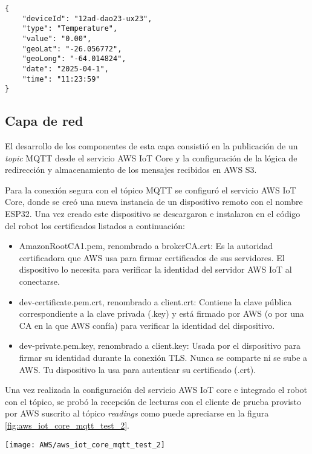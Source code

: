 \begin{lstlisting}
{   	
	"deviceId": "12ad-dao23-ux23",
	"type": "Temperature",
	"value": "0.00",
	"geoLat": "-26.056772",
	"geoLong": "-64.014824",
	"date": "2025-04-1",
	"time": "11:23:59"
}
\end{lstlisting}

\subsection{Capa de red}

El desarrollo de los componentes de esta capa consistió en la publicación de un \textit{topic} MQTT desde el servicio AWS IoT Core y la configuración de la lógica de redirección y almacenamiento de los mensajes recibidos en AWS S3.


Para la conexión segura con el tópico MQTT se configuró el servicio AWS IoT Core, donde se creó una nueva instancia de un dispositivo remoto con el nombre ESP32. Una vez creado este dispositivo se descargaron e instalaron en el código del robot los certificados listados a continuación:




\begin{itemize}
	\item AmazonRootCA1.pem, renombrado a brokerCA.crt:	Es la autoridad certificadora que AWS usa para firmar certificados de sus servidores. El dispositivo lo necesita para verificar la identidad del servidor AWS IoT al conectarse.
	\item dev-certificate.pem.crt, renombrado a client.crt: Contiene la clave pública correspondiente a la clave privada (.key) y está firmado por AWS (o por una CA en la que AWS confía) para verificar la identidad del dispositivo.
	\item dev-private.pem.key, renombrado a client.key: Usada por el dispositivo para firmar su identidad durante la conexión TLS. Nunca se comparte ni se sube a AWS. Tu dispositivo la usa para autenticar su certificado (.crt).
		
\end{itemize}

Una vez realizada la configuración del servicio AWS IoT core e integrado el robot con el tópico, se probó la recepción de lecturas con el cliente de prueba provisto por AWS suscrito al tópico \textit{readings} como puede apreciarse en la figura \ref{fig:aws_iot_core_mqtt_test_2}.

\begin{center}
   \texttt{[image: AWS/aws\_iot\_core\_mqtt\_test\_2]}
   \label{fig:aws_iot_core_mqtt_test_2}
\end{center}

